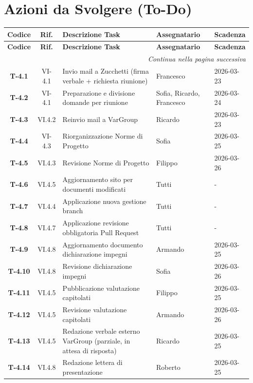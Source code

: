 \section{Azioni da Svolgere (To-Do)}
\begin{longtable}{c c p{4.5cm} l l}
	\toprule
	\textbf{Codice} & \textbf{Rif.} & \textbf{Descrizione Task} & \textbf{Assegnatario} & \textbf{Scadenza} \\
	\midrule
	\endfirsthead

	\toprule
	\textbf{Codice} & \textbf{Rif.} & \textbf{Descrizione Task} & \textbf{Assegnatario} & \textbf{Scadenza} \\
	\midrule
	\endhead

	\midrule
	\multicolumn{5}{r}{\textit{Continua nella pagina successiva}} \\
	\midrule
	\endfoot

	\bottomrule
	\endlastfoot
	
	\textbf{T-4.1} & VI-4.1 & Invio mail a Zucchetti (firma verbale + richiesta riunione) & Francesco & 2026-03-23 \\
	\textbf{T-4.2} & VI-4.1 & Preparazione e divisione domande per riunione & Sofia, Ricardo, Francesco & 2026-03-24 \\
	\textbf{T-4.3} & VI.4.2 & Reinvio mail a VarGroup & Ricardo & 2026-03-23 \\
	\textbf{T-4.4} & VI-4.3 & Riorganizzazione Norme di Progetto & Sofia & 2026-03-25 \\
	\textbf{T-4.5} & VI.4.3 & Revisione Norme di Progetto & Filippo & 2026-03-26 \\
	\textbf{T-4.6} & VI.4.5 & Aggiornamento sito per documenti modificati & Tutti & - \\
	\textbf{T-4.7} & VI.4.4 & Applicazione nuova gestione branch & Tutti & - \\
	\textbf{T-4.8} & VI.4.7 & Applicazione revisione obbligatoria Pull Request & Tutti & - \\
	\textbf{T-4.9} & VI.4.8 & Aggiornamento documento dichiarazione impegni & Armando & 2026-03-25 \\
	\textbf{T-4.10} & VI.4.8 & Revisione dichiarazione impegni & Sofia & 2026-03-26 \\
	\textbf{T-4.11} & VI.4.5 & Pubblicazione valutazione capitolati & Filippo & 2026-03-25 \\
	\textbf{T-4.12} & VI.4.5 & Revisione valutazione capitolati & Armando & 2026-03-26 \\
	\textbf{T-4.13} & VI.4.5 & Redazione verbale esterno VarGroup (parziale, in attesa di risposta) & Ricardo & 2026-03-25 \\
	\textbf{T-4.14} & VI.4.8 & Redazione lettera di presentazione & Roberto & 2026-03-25 \\
\end{longtable}

